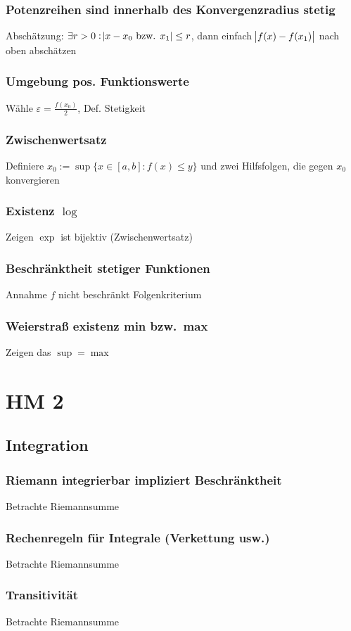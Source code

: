\subsection{Potenzreihen sind innerhalb des Konvergenzradius stetig }
 Abschätzung: $\exists r>0 : \abs{x-x_0 \text{ bzw. }
 x_1} \leq r$, dann einfach $\abs{f(x)-f(x_1)}$ nach oben abschätzen
\subsection{Umgebung pos. Funktionswerte }
 Wähle $\varepsilon = \frac{f(x_0)}{2}$, Def. Stetigkeit
\subsection{Zwischenwertsatz }
 Definiere $x_0 := \sup \{x \in [a,b] : f(x) \leq y \}$ und zwei Hilfsfolgen, die gegen $x_0$ konvergieren
\subsection{Existenz $\log$ }
 Zeigen $\exp$ ist bijektiv (Zwischenwertsatz)
\subsection{Beschränktheit stetiger Funktionen}
 Annahme $f$ nicht beschränkt Folgenkriterium
\subsection{Weierstraß existenz min bzw.\ max }
 Zeigen das $\sup=\max$

\chapter{HM 2}
\section{Integration}
\subsection{Riemann integrierbar impliziert Beschränktheit}
Betrachte Riemannsumme
\subsection{Rechenregeln für Integrale (Verkettung usw.)}
Betrachte Riemannsumme
\subsection{Transitivität}
Betrachte Riemannsumme
